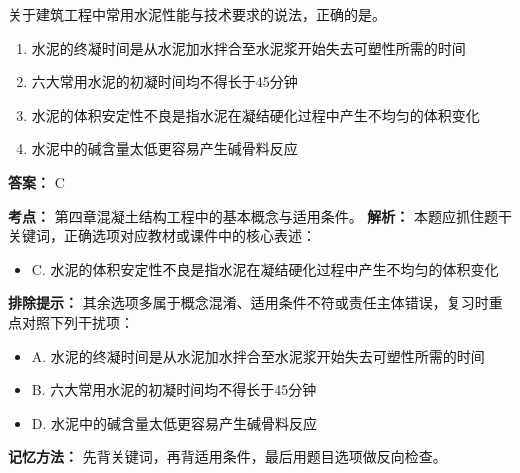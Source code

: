 \documentclass[UTF8,fontset=fandol,11pt]{ctexart}
\begin{document}
\begin{quizbox}[title={第 43 题}]
关于建筑工程中常用水泥性能与技术要求的说法，正确的是。\\
\begin{enumerate}[label=\Alph*.]
\item 水泥的终凝时间是从水泥加水拌合至水泥浆开始失去可塑性所需的时间
\item 六大常用水泥的初凝时间均不得长于45分钟
\item 水泥的体积安定性不良是指水泥在凝结硬化过程中产生不均匀的体积变化
\item 水泥中的碱含量太低更容易产生碱骨料反应
\end{enumerate}
\textbf{答案：} C
\vspace{0.25em}
\begin{answerbox}[title={考点解析}]
\textbf{考点：} 第四章混凝土结构工程中的基本概念与适用条件。
\textbf{解析：} 本题应抓住题干关键词，正确选项对应教材或课件中的核心表述：
\begin{itemize}
\item C. 水泥的体积安定性不良是指水泥在凝结硬化过程中产生不均匀的体积变化
\end{itemize}
\textbf{排除提示：} 其余选项多属于概念混淆、适用条件不符或责任主体错误，复习时重点对照下列干扰项：
\begin{itemize}
\item A. 水泥的终凝时间是从水泥加水拌合至水泥浆开始失去可塑性所需的时间
\item B. 六大常用水泥的初凝时间均不得长于45分钟
\item D. 水泥中的碱含量太低更容易产生碱骨料反应
\end{itemize}
\textbf{记忆方法：} 先背关键词，再背适用条件，最后用题目选项做反向检查。
\end{answerbox}
\end{quizbox}
\end{document}
